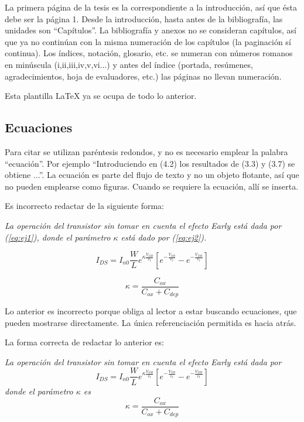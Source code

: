 La primera página de la tesis es la correspondiente a la introducción, así que
ésta debe ser la página 1. Desde la introducción, hasta antes de la
bibliografía, las unidades son ``Capítulos''. La bibliografía y anexos no se
consideran capítulos, así que ya no continúan con la misma numeración de los
capítulos (la paginación sí continua). Los índices, notación, glosario, etc. se
numeran con números romanos en minúscula (i,ii,iii,iv,v,vi...) y antes del
índice (portada, resúmenes, agradecimientos, hoja de evaluadores, etc.) las
páginas no llevan numeración. 

Esta plantilla LaTeX ya se ocupa de todo lo anterior.

\subsection{Ecuaciones}

Para citar  se utilizan paréntesis redondos, y no es necesario
emplear la palabra ``ecuación''. Por ejemplo ``Introduciendo en (4.2) los
resultados de (3.3) y (3.7) se obtiene ...''. La ecuación es parte del flujo de
texto y no un objeto flotante, así que no pueden emplearse como figuras. Cuando
se requiere la ecuación, allí se inserta.  

Es incorrecto redactar de la siguiente forma: 

\textsl{La operación del transistor sin tomar en cuenta el efecto Early está
  dada por (\ref{eq:ej1}), donde el parámetro $\kappa$ está dado por
  (\ref{eq:ej2}).}

\begin{equation} \label{eq:ej1}
  I_{DS}
  =
  I_{n0} \frac{W}{L}e^{\kappa \frac{V_{GB}}{v_t}}
  \left[
    e^{-\frac{V_{SB}}{v_t}}
    -
    e^{-\frac{V_{DB}}{v_t}}
  \right]
\end{equation}

\begin{equation} \label{eq:ej2}
  \kappa = \frac{C_{ox}}{C_{ox}+C_{dep}}
\end{equation}

Lo anterior es incorrecto porque obliga al lector a estar buscando ecuaciones,
que pueden mostrarse directamente.  La única referenciación permitida es hacia
atrás.

La forma correcta de redactar lo anterior es: 

\textsl{La operación del transistor sin tomar en cuenta el efecto Early está
  dada por}
\begin{equation} \label{eq:ej3}
  I_{DS}
  =
  I_{n0} \frac{W}{L}e^{\kappa \frac{V_{GB}}{v_t}}
  \left[
    e^{-\frac{V_{SB}}{v_t}}
    -
    e^{-\frac{V_{DB}}{v_t}}
  \right]
\end{equation}
\textsl{donde el parámetro $\kappa$ es}
\begin{equation} \label{eq:ej4}
  \kappa = \frac{C_{ox}}{C_{ox}+C_{dep}}
\end{equation}

